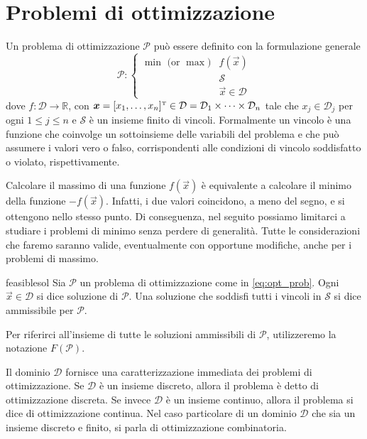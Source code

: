 \section{Problemi di ottimizzazione}\label{sec:opt_prob}
Un problema di ottimizzazione \( \mathcal{P} \) può essere definito con la formulazione generale
\begin{equation}\label{eq:opt_prob}
    \mathcal{P}\colon\left\{
    \begin{array}{ll}
        \min \text{ (or } \max) & f(\vec{x}) \\
                               & \mathcal{S} \\
                               & \vec{x} \in \mathcal{D}
    \end{array}\right.
\end{equation}
dove \( f\colon \mathcal{D} \to \mathbb{R}\), con \( \bm{x} = [x_1, \ldots, x_n]^{\scriptscriptstyle\mathrm{T}} \in \mathcal{D} = \mathcal{D}_1
\times \dots \times \mathcal{D}_n \) tale che \( x_j \in \mathcal{D}_j \) per ogni \( 1 \leq j \leq n \) e \(
\mathcal{S} \) è un insieme finito di vincoli. Formalmente un vincolo è una funzione che coinvolge un sottoinsieme delle
variabili del problema e che può assumere i valori vero o falso, corrispondenti alle condizioni di vincolo soddisfatto o
violato, rispettivamente.

Calcolare il massimo di una funzione
\(
    f(\vec{x})
\)
è equivalente a calcolare il minimo della funzione
\(
    -f(\vec{x})
\). Infatti, i due valori coincidono, a meno del segno, e si ottengono nello stesso punto.
Di conseguenza, nel seguito possiamo limitarci a studiare i problemi di minimo senza perdere di generalità. Tutte le
considerazioni che faremo saranno valide, eventualmente con opportune modifiche, anche per i problemi di massimo.

\begin{definition}{}{feasiblesol}
    Sia \( \mathcal{P} \) un problema di ottimizzazione come in \eqref{eq:opt_prob}. Ogni \( \vec{x} \in \mathcal{D} \)
    si dice soluzione di \( \mathcal{P} \). Una soluzione che soddisfi tutti i vincoli in \( \mathcal{S} \) si dice
    ammissibile per \( \mathcal{P} \).
\end{definition}
\noindent
Per riferirci all'insieme di tutte le soluzioni ammissibili di \( \mathcal{P} \), utilizzeremo la notazione \(
F(\mathcal{P}) \).

Il dominio \( \mathcal{D} \) fornisce una caratterizzazione immediata dei problemi di ottimizzazione. Se \( \mathcal{D}
\) è un insieme discreto, allora il problema è detto di ottimizzazione discreta. Se invece  \( \mathcal{D} \) è un
insieme continuo, allora il problema si dice di ottimizzazione continua. Nel caso particolare di un dominio \(
\mathcal{D} \) che sia un insieme discreto e finito, si parla di ottimizzazione combinatoria.

